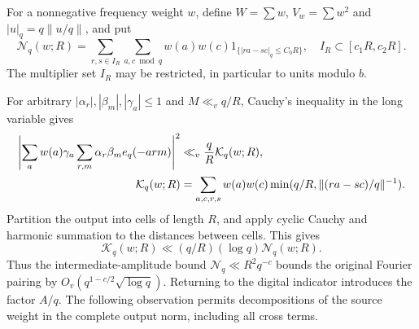 \documentclass[11pt,a4paper]{article}
\theoremstyle{paperplain}
\numberwithin{equation}{section}
\begin{document}
For a nonnegative frequency weight $w$, define
$W=\sum w$, $V_w=\sum w^2$ and $|u|_q=q\|u/q\|$, and put
\[
 \mathcal N_q(w;R)=\sum_{r,s\in I_R}\sum_{a,c\bmod q}w(a)w(c)
 1_{\{|ra-sc|_q\le C_0R\}},\quad I_R\subset[c_1R,c_2R].
\]
The multiplier set $I_R$ may be restricted, in particular to units
modulo $b$.

For arbitrary $|\alpha_r|,|\beta_m|,|\gamma_a|\le1$ and
$M\ll_vq/R$, Cauchy's inequality in the long variable gives
\begin{align}
 \left|\sum_aw(a)\gamma_a\sum_{r,m}\alpha_r\beta_m e_q(-arm)\right|^2
 &\ll_v\frac qR\mathcal K_q(w;R),\label{dec:cauchy}\\
 \mathcal K_q(w;R)&=\sum_{a,c,r,s}w(a)w(c)
 \min(q/R,\|(ra-sc)/q\|^{-1}).\notag
\end{align}
Partition the output into cells of length $R$, and apply cyclic Cauchy
and harmonic summation to the distances between cells. This gives
\[
 \mathcal K_q(w;R)\ll(q/R)(\log q)\mathcal N_q(w;R).
\]
Thus the intermediate-amplitude bound
$\mathcal N_q\ll R^2q^{-c}$ bounds the original Fourier pairing
by $O_v(q^{1-c/2}\sqrt{\log q})$.
Returning to the digital indicator introduces the factor $A/q$.
The following observation permits decompositions of the source weight
in the complete output norm, including all cross terms.
\end{document}
